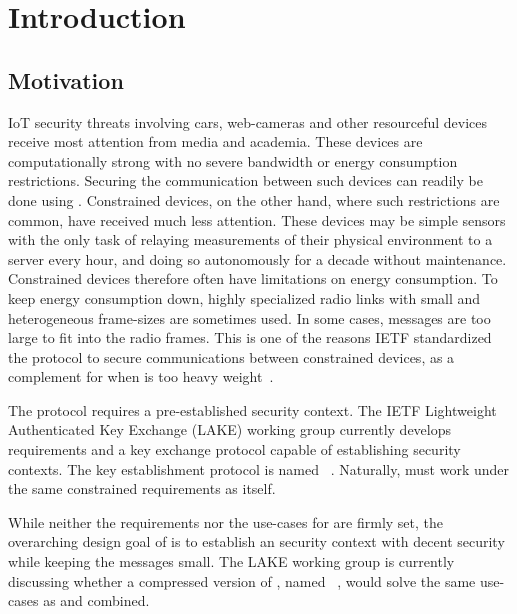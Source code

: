 \documentclass[runningheads]{llncs}
\begin{document}
\section{Introduction}
\label{sec:introduction}
\subsection{Motivation}
\label{sec:motivation}
IoT security threats involving cars, web-cameras and other resourceful devices
receive most attention from media and academia.
%
These devices are computationally strong with no severe bandwidth or energy
consumption restrictions.
%
Securing the communication between such devices can readily be done using
\mDandTls.
%
Constrained devices, on the other hand, where such restrictions are common,
have received much less attention.
%
These devices may be simple sensors with the only task of relaying
measurements of their physical environment to a server every hour, and doing so
autonomously for a decade without maintenance.
%
Constrained devices therefore often have limitations on energy consumption.
%
To keep energy consumption down, highly specialized radio links with small
and heterogeneous frame-sizes are sometimes used.
%
In some cases, \mDandTls messages are too large to fit into the radio frames.
%
This is one of the reasons IETF standardized the \mOscore protocol to secure
communications between constrained devices, as a complement for when \mDandTls
is too heavy weight~\cite{rfc8613}.
%

The \mOscore protocol requires a pre-established security context.
%
The IETF Lightweight Authenticated Key Exchange (LAKE) working group
currently develops requirements and a key exchange protocol capable of
establishing \mOscore security contexts.
%
The key establishment protocol is named \mEdhoc~\cite{selander-lake-edhoc-01}.
%
Naturally, \mEdhoc must work under the same constrained requirements as
\mOscore itself.
%

While neither the requirements nor the use-cases for \mEdhoc are firmly set,
the overarching design goal of \mEdhoc is to establish an \mOscore security
context with decent security while keeping the messages small.
%
The LAKE working group is currently discussing whether a compressed version of
\mTls, named \mCtls~\cite{ietf-tls-ctls-00}, would solve the same use-cases as
\mOscore and \mEdhoc combined.
%
\end{document}
